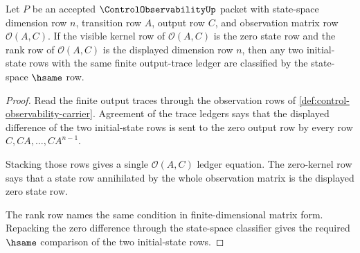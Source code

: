 \begin{theorem}
\label{thm:control-observability-kernel-separation}
Let $P$ be an accepted $\ControlObservabilityUp$ packet with state-space dimension row $n$, transition row $A$, output row $C$, and observation matrix row $\mathcal O(A,C)$. If the visible kernel row of $\mathcal O(A,C)$ is the zero state row and the rank row of $\mathcal O(A,C)$ is the displayed dimension row $n$, then any two initial-state rows with the same finite output-trace ledger are classified by the state-space $\hsame$ row.
\end{theorem}
\begin{proof}
Read the finite output traces through the observation rows of \autoref{def:control-observability-carrier}. Agreement of the trace ledgers says that the displayed difference of the two initial-state rows is sent to the zero output row by every row $C,CA,\ldots,CA^{n-1}$.

Stacking those rows gives a single $\mathcal O(A,C)$ ledger equation. The zero-kernel row says that a state row annihilated by the whole observation matrix is the displayed zero state row.

The rank row names the same condition in finite-dimensional matrix form. Repacking the zero difference through the state-space classifier gives the required $\hsame$ comparison of the two initial-state rows.
\end{proof}

